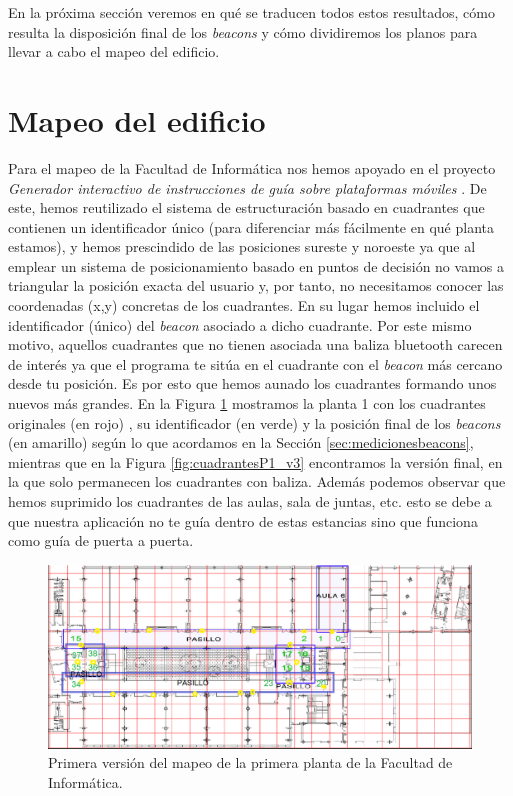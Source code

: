 En la próxima sección veremos en qué se traducen todos estos resultados, cómo resulta la disposición final de los \textit{beacons} y cómo dividiremos los planos para llevar a cabo el mapeo del edificio.


\section{Mapeo del edificio}
\label{sec:mapeo}
Para el mapeo de la Facultad de Informática nos hemos apoyado en el proyecto \textit{Generador interactivo de instrucciones de guía sobre plataformas móviles} \citep{TFGguia}. De este, hemos reutilizado el sistema de estructuración basado en cuadrantes que contienen un identificador único (para diferenciar más fácilmente en qué planta estamos), y hemos prescindido de las posiciones sureste y noroeste ya que al emplear un sistema de posicionamiento basado en puntos de decisión no vamos a triangular la posición exacta del usuario y, por tanto, no necesitamos conocer las coordenadas (x,y) concretas de los cuadrantes. En su lugar hemos incluido el identificador (único) del \textit{beacon} asociado a dicho cuadrante. Por este mismo motivo, aquellos cuadrantes que no tienen asociada una baliza bluetooth carecen de interés ya que el programa te sitúa en el cuadrante con el \textit{beacon} más cercano desde tu posición. Es por esto que hemos aunado los cuadrantes formando unos nuevos más grandes. En la Figura \ref{fig:cuadrantesP1_v1} mostramos la planta 1 con los cuadrantes originales (en rojo) , su identificador (en verde) y la posición final de los \textit{beacons} (en amarillo) según lo que acordamos en la Sección \ref{sec:medicionesbeacons}, mientras que en la Figura \ref{fig:cuadrantesP1_v3} encontramos la versión final, en la que solo permanecen los cuadrantes con baliza. Además podemos observar que hemos suprimido los cuadrantes de las aulas, sala de juntas, etc. esto se debe a que nuestra aplicación no te guía dentro de estas estancias sino que funciona como guía de puerta a puerta.

\begin{figure}[t]
	\centering
	\includegraphics[width=1\textwidth]{Imagenes/Descripciondeltrabajo/mapaplanta1_cuadrantes}
	\caption{Primera versión del mapeo de la primera planta de la Facultad de Informática.}
	\label{fig:cuadrantesP1_v1}
\end{figure}

